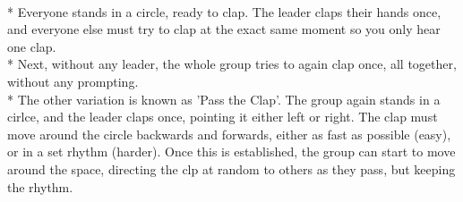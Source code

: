 \begin{minipage}{\textwidth}
\\*
Everyone stands in a circle, ready to clap.  The leader claps their hands once, and everyone else must try to clap at the exact same moment so you only hear one clap.\\*
Next, without any leader, the whole group tries to again clap once, all together, without any prompting.\\*
The other variation is known as 'Pass the Clap'.  The group again stands in a cirlce, and the leader claps once, pointing it either left or right.  The clap must move around the circle backwards and forwards, either as fast as possible (easy), or in a set rhythm (harder).  Once this is established, the group can start to move around the space, directing the clp at random to others as they pass, but keeping the rhythm.
\end{minipage}    \vfill

